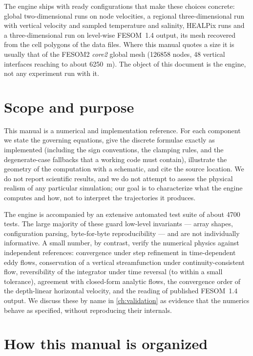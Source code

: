 The engine ships with ready configurations that make these choices concrete: global two-dimensional
runs on node velocities, a regional three-dimensional run with vertical velocity and sampled temperature
and salinity, HEALPix runs and a three-dimensional run on level-wise FESOM~1.4
output, its mesh recovered from the cell polygons of the data files. Where this manual quotes a size it is usually that of
the FESOM2 \emph{core2} global mesh (\num{126858} nodes, 48 vertical interfaces reaching to about
\SI{6250}{\metre}). The object of this document is the engine, not any experiment run with it.

\section{Scope and purpose}\label{sec:intro-scope}

This manual is a numerical and implementation reference. For each component we
state the governing equations, give the discrete formulae exactly as implemented
(including the sign conventions, the clamping rules, and the degenerate-case
fallbacks that a working code must contain), illustrate the geometry of the
computation with a schematic, and cite the source location. We do not report
scientific results, and we do not attempt to assess the physical realism of any
particular simulation; our goal is to characterize what the engine computes and
how, not to interpret the trajectories it produces.

The engine is accompanied by an extensive automated test suite of about \num{4700} tests. The large majority of these guard low-level invariants --- array
shapes, configuration parsing, byte-for-byte reproducibility --- and are not
individually informative. A small number, by contrast, verify the numerical
physics against independent references: convergence under step refinement in
time-dependent eddy flows, conservation of a
vertical streamfunction under continuity-consistent flow, reversibility of
the integrator under time reversal (to within a small tolerance), agreement with closed-form analytic flows,
the convergence order of the depth-linear horizontal velocity, and the reading of published FESOM~1.4
output.
We discuss these by name in \cref{ch:validation} as evidence that the numerics
behave as specified, without reproducing their internals.

\section{How this manual is organized}\label{sec:intro-org}

